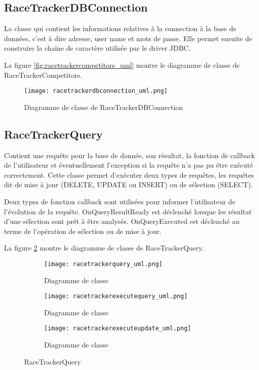 \subsection{RaceTrackerDBConnection}

La classe qui contient les informations relatives à la connection à la base de données, c'est à dire adresse, user name et mots de passe. Elle permet ensuite de construire la chaîne de caractère utilisée par le driver JDBC.

La figure \ref{fig:racetrackercompetitors_uml} montre le diagramme de classe de RaceTrackerCompetitors.

\begin{figure}[htb]
\centering 
\texttt{[image: racetrackerdbconnection\_uml.png]} 
\caption{Diagramme de classe de RaceTrackerDBConnection}
\label{fig:racetrackerdbconnection_uml}
 \end{figure}

\subsection{RaceTrackerQuery}

Contient une requête pour la base de donnée, son résultat, la fonction de callback de l'utilisateur et éventuellement l'exception si la requête n'a pas pu être exécuté correctement. Cette classe permet d'exécuter deux types de requêtes, les requêtes dit de mise à jour (DELETE, UPDATE ou INSERT) ou de sélection (SELECT).

Deux types de fonction callback sont utilisées pour informer l'utilisateur de l'évolution de la requête. OnQueryResultReady est déclenché lorsque les résultat d'une sélection sont prêt à être analysés. OnQueryExecuted est déclenché au terme de l'opération de sélection ou de mise à jour.

La figure \ref{fig:racetrackerquery_uml} montre le diagramme de classe de RaceTrackerQuery.

 \begin{figure}[htb]
    \centering
    \begin{subfigure}[htb]{1\textwidth}
		\texttt{[image: racetrackerquery\_uml.png]} 
		\caption{Diagramme de classe}
		\label{fig:racetrackerquery_uml}
    \end{subfigure}
    \begin{subfigure}[htb]{1\textwidth}
		\texttt{[image: racetrackerexecutequery\_uml.png]} 
		\caption{Diagramme de classe}
		\label{fig:racetrackerexecutequery_uml}
    \end{subfigure}
        \begin{subfigure}[htb]{1\textwidth}
		\texttt{[image: racetrackerexecuteupdate\_uml.png]} 
		\caption{Diagramme de classe}
		\label{fig:racetrackerexecuteupdate_uml}
    \end{subfigure}
    \caption{RaceTrackerQuery}\label{fig:racetrackerquery_fig}
\end{figure}


